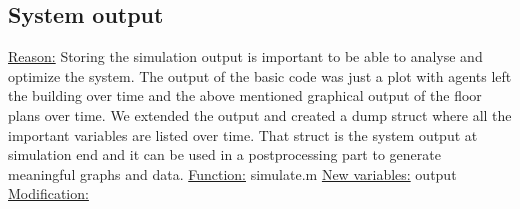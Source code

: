 \documentclass[11pt]{article}
\begin{document}
\subsection{System output}
\underline{Reason:}
\newline
Storing the simulation output is important to be able to analyse and optimize the system. The output of the basic code was just a plot with agents left the building over time and the above mentioned graphical output of the floor plans over time. We extended the output and created a dump struct where all the important variables are listed over time. That struct is the system output at simulation end and it can be used in a postprocessing part to generate meaningful graphs and data.
\newline
\underline{Function:}
\newline
simulate.m
\newline
\underline{New variables:}
\newline
output
\newline
\newpage
\underline{Modification:}
\end{document}
